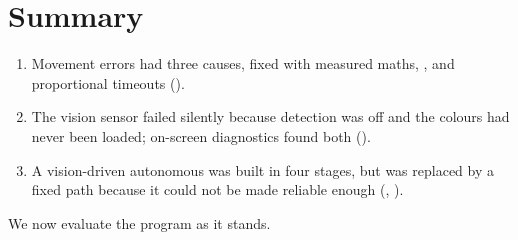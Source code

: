 \section{Summary}

\begin{enumerate}
  \item Movement errors had three causes, fixed with measured maths, ,
    and proportional timeouts ().
  \item The vision sensor failed silently because detection was off and the
    colours had never been loaded; on-screen diagnostics found both
    ().
  \item A vision-driven autonomous was built in four stages, but was replaced by a
    fixed path because it could not be made reliable enough
    (, ).
\end{enumerate}

We now evaluate the program as it stands.
